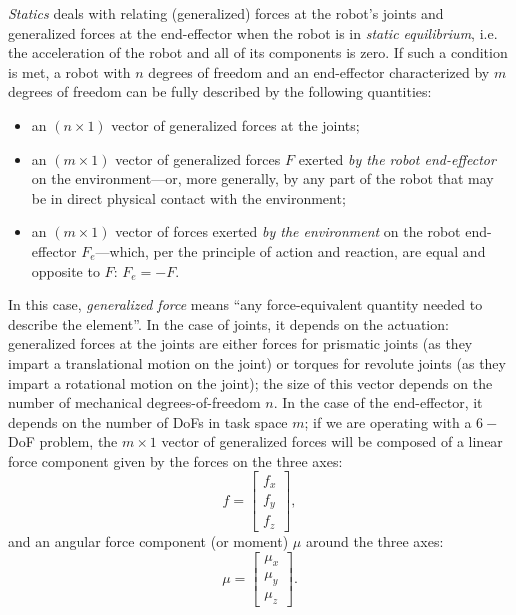 \textsl{Statics} deals with relating (generalized) forces at the robot's joints and generalized forces at the end-effector when the robot is in \textsl{static equilibrium}, i.e. the acceleration of the robot and all of its components is zero.
If such a condition is met, a robot with $n$ degrees of freedom and an end-effector characterized by $m$ degrees of freedom can be fully described by the following quantities:
\begin{itemize}
    \item an $\left( n \times 1 \right)$ vector of generalized forces at the joints;
    \item an $\left( m \times 1 \right)$ vector of generalized forces $F$ exerted \textsl{by the robot end-effector} on the environment---or, more generally, by any part of the robot that may be in direct physical contact with the environment;
    \item an $\left( m \times 1 \right)$ vector of forces exerted \textsl{by the environment} on the robot end-effector $F_e$---which, per the principle of action and reaction, are equal and opposite to $F$: $F_e=-F$.
\end{itemize}
In this case, \textsl{generalized force} means ``any force-equivalent quantity needed to describe the element''.
In the case of joints, it depends on the actuation: generalized forces at the joints are either forces for prismatic joints (as they impart a translational motion on the joint) or torques for revolute joints (as they impart a rotational motion on the joint); the size of this vector depends on the number of mechanical degrees-of-freedom $n$.
In the case of the end-effector, it depends on the number of DoFs in task space $m$; if we are operating with a $6-$DoF problem, the $m \times 1$ vector of generalized forces will be composed of a linear force component given by the forces on the three axes:
\begin{equation}
f=\left[\begin{array}{c}
f_x\\
f_y\\
f_z
\end{array}
\right],
\end{equation}
and an angular force component (or moment) $\mu$ around the three axes:
\begin{equation}
\mu=\left[\begin{array}{c}
\mu_x\\
\mu_y\\
\mu_z
\end{array}
\right].
\end{equation}
